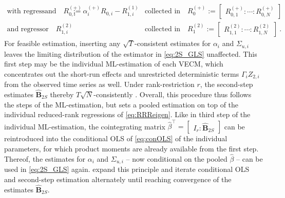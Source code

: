 \begin{align}
	\text{with regressand} \quad R^{(+)}_{0,i} & := \alpha_{i}^{(+)} R^{\ }_{0,i} - R_{1,i}^{(1)} & \text{collected in} \quad R_0^{(+)} := \begin{bmatrix} R^{(+)}_{0,1} : \cdots : R^{(+)}_{0,N} \end{bmatrix} & \nonumber \\
	\text{and regressor} \quad R_{1,i}^{(2)} &  & \text{collected in} \quad R_1^{(2)} := \begin{bmatrix} R_{1,1}^{(2)} : \cdots : R_{1,N}^{(2)} \end{bmatrix} &. \nonumber
\end{align}
For feasible estimation, inserting any $ \sqrt{T} $-consistent estimates for $ \alpha_i $ and $ \Sigma_{u,i} $ leaves the limiting distribution of the estimator in \eqref{eq:2S_GLS} unaffected. This first step may be the individual ML-estimation of each VECM, which concentrates out the short-run effects and unrestricted deterministic terms $ \Gamma_i Z_{2,i} $ from the observed time series as well. Under rank-restriction $ r $, the second-step estimates $ \widehat{\mathbf{B}}_{2S}$ thereby $ T\sqrt{N} $-consistently \citep[p.~156, Th.~1]{Breitung2005}. Overall, this procedure thus follows the steps of the ML-estimation, but sets a pooled estimation on top of the individual reduced-rank regressions of \eqref{eq:RRReigen}. Like in third step of the individual ML-estimation, the cointegrating matrix $ \widehat{\beta}^\top = \begin{bmatrix} I_r : \widehat{\mathbf{B}}_{2S} \end{bmatrix} $ can be reintroduced into the conditional OLS of \eqref{eq:conOLS} of the individual parameters, for which product moments are already available from the first step. Thereof, the estimates for $ \alpha_i $ and $ \Sigma_{u,i} $ -- now conditional on the pooled $ \widehat{\beta} $ -- can be used in \eqref{eq:2S_GLS} again. \citet[p.~195]{HlouskovaWagner2010} expand this principle and iterate conditional OLS and second-step estimation alternately until reaching convergence of the estimates $ \widehat{\mathbf{B}}_{2S} $.


